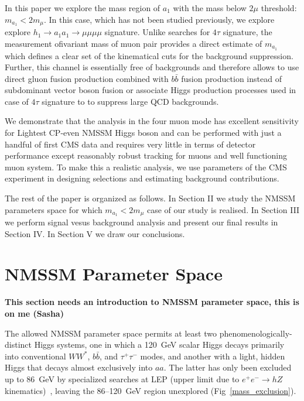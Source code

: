 \documentclass[aps,12pt,superscriptaddress,nofootinbib,floatfix,showpacs]{revtex4}
\begin{document}
In this paper we explore the  mass region of  $a_1$ 
with the mass below $2\mu$ threshold: $m_{a_1}<2m_\mu$.
In this case, which has not been studied previously, we explore
explore $h_1 \to a_1a_1 \to \mu \mu \mu \mu$ signature.
Unlike searches for $4\tau$ signature,
the measurement ofivariant mass of muon pair provides a 
direct estimate of $m_{a_1}$ which defines a clear set of the kinematical
cuts for the background suppression. 
Further, this
channel is essentially free of backgrounds and therefore allows to use
direct gluon fusion production combined with  $b\bar{b}$ fusion production
instead of subdominant  vector boson fusion or associate 
Higgs production processes used in case of $4\tau$ signature to to suppress large QCD
backgrounds.



We demonstrate that the analysis in
the four muon mode has excellent sensitivity for Lightest CP-even NMSSM Higgs boson
and can be performed with just  a handful of first CMS data and requires 
very little in terms of detector performance  except reasonably robust tracking 
for muons and well functioning muon system. To make 
this a realistic analysis, we use parameters of the CMS experiment in designing
selections and estimating background contributions.

The rest of the paper is organized as follows.
In Section II we study the NMSSM parameters space 
for which $m_{a_1}<2m_\mu$ case of our study is realised.
In Section III we perform signal vesus background analysis
and present our final  results in Section IV.
In Section V we draw our conclusions.

\section{NMSSM Parameter Space}


{\bf This section needs an introduction to NMSSM parameter space,
     this is on me (Sasha)
}

The allowed NMSSM parameter space permits at least two
phenomenologically-distinct Higgs systems, one in which a 120~GeV
scalar Higgs decays primarily into conventional $WW^*$, $b\bar{b}$,
and $\tau^+\tau^-$ modes, and another with a light, hidden Higgs that decays
almost exclusively into $aa$.  The latter has only been excluded up to
86~GeV by specialized searches at LEP (upper limit due to $e^+e^- \to
h Z$ kinematics)~\cite{lep1exclusion,lep2exclusion}, leaving the
86--120~GeV region unexplored (Fig~\ref{mass_exclusion}).
\end{document}
